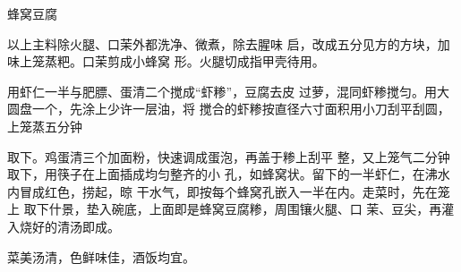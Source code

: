 \begin{recipe}{蜂窝豆腐}

\ingredients


\cooking

\step 以上主料除火腿、口茉外都洗净、微煮，除去腥味 启，改成五分见方的方块，加味上笼蒸粑。口茉剪成小蜂窝 形。火腿切成指甲壳待用。

\step 用虾仁一半与肥膘、蛋清二个搅成“虾糁”，豆腐去皮 过萝，混同虾糁搅匀。用大圆盘一个，先涂上少许一层油，将 搅合的虾糁按直径六寸面积用小刀刮平刮圆，上笼蒸五分钟

取下。鸡蛋清三个加面粉，快速调成蛋泡，再盖于糁上刮平 整，又上笼气二分钟取下，用筷子在上面插成均匀整齐的小 孔，如蜂窝状。留下的一半虾仁，在沸水内冒成红色，捞起，晾 干水气，即按每个蜂窝孔嵌入一半在内。走菜时，先在笼上 取下什景，垫入碗底，上面即是蜂窝豆腐糁，周围镶火腿、口 茉、豆尖，再灌入烧好的清汤即成。

\notes

菜美汤清，色鲜味佳，酒饭均宜。

\end{recipe}

